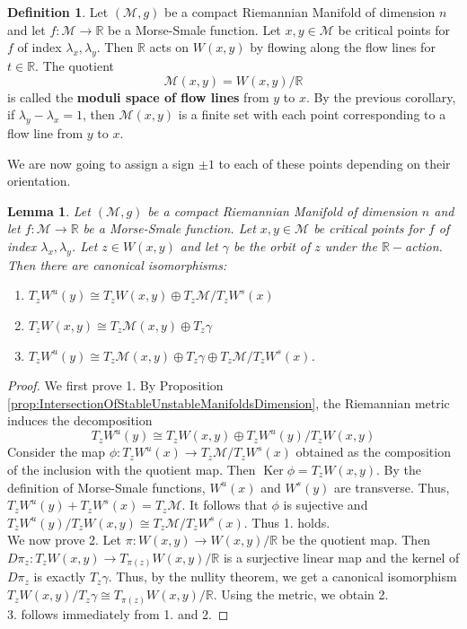 \documentclass[10pt]{article}
\theoremstyle{plain}
\newtheorem{lemma}[thm]{Lemma}
\theoremstyle{definition}
\newtheorem{defn}[thm]{Definition} %
\newcommand{\Real}{\mathbb{R}}
\newcommand{\man}{\mathcal{M}}
\DeclareMathOperator{\Ker}{Ker}
\begin{document}
\begin{defn}
    Let $(\man,g)$ be a compact Riemannian Manifold of dimension $n$ and let $f:\man\to\Real$ be a Morse-Smale function. Let $x,y\in\man$ be critical points for $f$ of index $\lambda_x,\lambda_y$. Then $\Real$ acts on $W(x,y)$ by flowing along the flow lines for $t\in\Real$. The quotient
        $$\man(x,y) = W(x,y) / \Real$$
    is called the \textbf{moduli space of flow lines} from $y$ to $x$. By the previous corollary, if $\lambda_y -\lambda_x = 1$, then $\man(x,y)$ is a finite set with each point corresponding to a flow line from $y$ to $x$.
\end{defn}
 We are now going to assign a sign $\pm 1$ to each of these points depending on their orientation.
\begin{lemma}
     Let $(\man,g)$ be a compact Riemannian Manifold of dimension $n$ and let $f:\man\to\Real$ be a Morse-Smale function. Let $x,y\in\man$ be critical points for $f$ of index $\lambda_x,\lambda_y$. Let $z\in W(x,y)$ and let $\gamma$ be the orbit of $z$ under the $\Real-$action. Then there are canonical isomorphisms:
    \begin{enumerate}
        \item $T_zW^u(y) \cong T_zW(x,y) \oplus T_z\man / T_z W^s(x)$
        \item $T_zW(x,y) \cong T_z\man(x,y) \oplus T_z\gamma$
        \item $T_zW^u(y) \cong T_z\man(x,y) \oplus T_z\gamma \oplus T_z\man / T_zW^s(x)$.
    \end{enumerate}
\end{lemma}

\begin{proof}
        We first prove 1. By Proposition \ref{prop:IntersectionOfStableUnstableManifoldsDimension}, the Riemannian metric induces the decomposition       
            $$T_zW^u(y) \cong T_zW(x,y)\oplus T_zW^u(y) / T_zW(x,y)$$
        Consider the map $\phi:T_zW^u(x) \to T_z\man / T_zW^s(x)$ obtained as the composition of the inclusion with the quotient map. Then $\Ker \phi = T_zW(x,y)$. By the definition of Morse-Smale functions, $W^u(x)$ and $W^s(y)$ are transverse. Thus, $T_zW^u(y) + T_zW^s(x) = T_z\man$. It follows that $\phi$ is sujective and $T_zW^u(y) / T_zW(x,y) \cong T_z\man / T_zW^s(x)$. Thus 1. holds.\\
        We now prove 2. Let $\pi:W(x,y) \to W(x,y)/\Real$ be the quotient map. Then $D\pi_z : T_zW(x,y) \to T_{\pi(z)} W(x,y) /\Real$ is a surjective linear map and the kernel of $D\pi_z$ is exactly $T_z\gamma$. Thus, by the nullity theorem, we get a canonical isomorphism $T_zW(x,y) / T_z\gamma \cong T_{\pi(z)} W(x,y)/ \Real$.
        Using the metric, we obtain 2.\\
        3. follows immediately from 1. and 2.
\end{proof}
\end{document}
